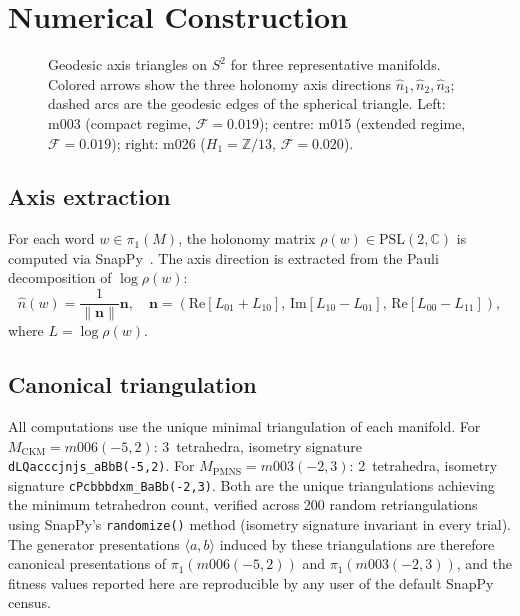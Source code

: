\documentclass[11pt,a4paper]{article}
\newcommand{\PSL}{\mathrm{PSL}(2,\mathbb{C})}
\begin{document}
\section{Numerical Construction}
\label{sec:construction}


\begin{figure}[!t]
\centering
\caption{Geodesic axis triangles on $S^2$ for three representative manifolds.
Colored arrows show the three holonomy axis directions $\hat{n}_1, \hat{n}_2,
\hat{n}_3$; dashed arcs are the geodesic edges of the spherical triangle.
Left: m003 (compact regime, $\mathcal{F} = 0.019$);
centre: m015 (extended regime, $\mathcal{F} = 0.019$);
right: m026 ($H_1 = \mathbb{Z}/13$, $\mathcal{F} = 0.020$).}
\label{fig:geodesic}
\end{figure}




\subsection{Axis extraction}

For each word $w \in \pi_1(M)$, the holonomy matrix $\rho(w) \in \PSL$
is computed via SnapPy~\cite{snappy}. The axis direction is extracted
from the Pauli decomposition of $\log \rho(w)$:
\begin{equation}
  \hat{n}(w) = \frac{1}{\|\mathbf{n}\|}\mathbf{n}, \quad
  \mathbf{n} = \left(\mathrm{Re}[L_{01}+L_{10}],\,
                      \mathrm{Im}[L_{10}-L_{01}],\,
                      \mathrm{Re}[L_{00}-L_{11}]\right),
\end{equation}
where $L = \log \rho(w)$.


\subsection{Canonical triangulation}
\label{subsec:canonical_triang}

All computations use the unique minimal triangulation of each manifold.
For $M_\mathrm{CKM} = m006(-5,2)$: 3~tetrahedra, isometry signature
\texttt{dLQacccjnjs\_aBbB(-5,2)}.
For $M_\mathrm{PMNS} = m003(-2,3)$: 2~tetrahedra, isometry signature
\texttt{cPcbbbdxm\_BaBb(-2,3)}.
Both are the unique triangulations achieving the minimum tetrahedron count,
verified across 200 random retriangulations using SnapPy's
\texttt{randomize()} method (isometry signature invariant in every trial).
The generator presentations $\langle a, b\rangle$ induced by these
triangulations are therefore canonical presentations of
$\pi_1(m006(-5,2))$ and $\pi_1(m003(-2,3))$, and the fitness values
reported here are reproducible by any user of the default SnapPy census.
\end{document}
